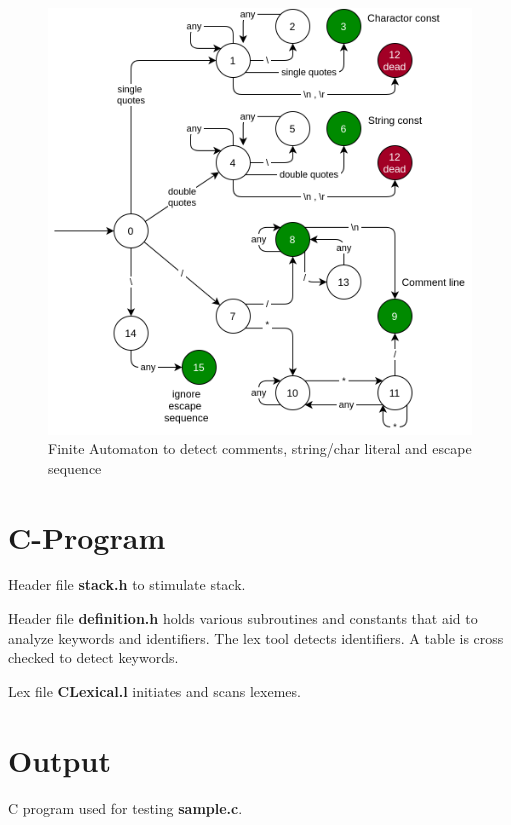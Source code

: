 \begin{figure}[H]
	\centering
	\includegraphics[width=\textwidth]{../EXP1/char-stream.png}
	\caption{Finite Automaton to detect comments, string/char literal and escape sequence}
\end{figure}


\section{C-Program}
Header file \textbf{stack.h} to stimulate stack.


\vspace{0.5cm}
Header file \textbf{definition.h} holds various subroutines and constants that aid to analyze keywords and identifiers. The lex tool detects identifiers. A table is cross checked to detect keywords.


\vspace{0.5cm}
Lex file \textbf{CLexical.l} initiates and scans lexemes.




\section{Output}
C program used for testing \textbf{sample.c}.




